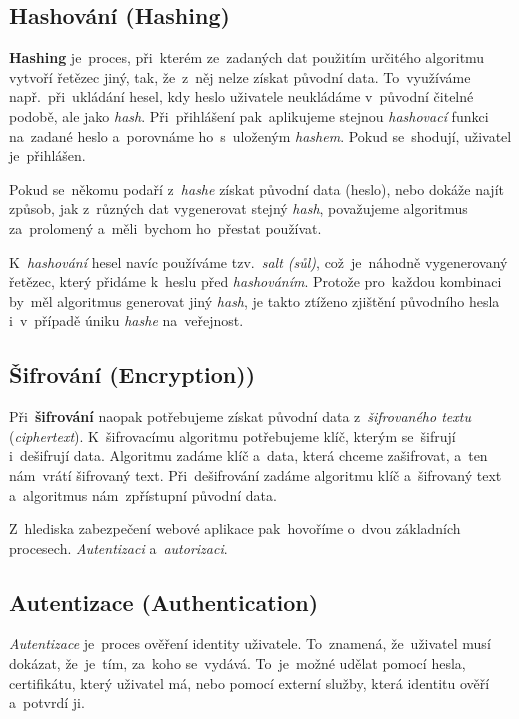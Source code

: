 \documentclass[11pt,a4paper]{report}
\begin{document}
            \subsection{Hashování (Hashing)}
                \textbf{Hashing} je~proces, při~kterém ze~zadaných dat použitím určitého algoritmu vytvoří řetězec jiný, tak, že~z~něj nelze získat původní data. To~využíváme např.~při~ukládání hesel, kdy heslo uživatele neukládáme v~původní čitelné podobě, ale jako \emph{hash}. Při~přihlášení pak~aplikujeme stejnou \emph{hashovací} funkci na~zadané heslo a~porovnáme ho~s~uloženým \emph{hashem}. Pokud se~shodují, uživatel je~přihlášen.
                
                Pokud se~někomu podaří z~\emph{hashe} získat původní data (heslo), nebo dokáže najít způsob, jak z~různých dat vygenerovat stejný \emph{hash}, považujeme algoritmus za~prolomený a~měli~bychom ho~přestat používat.
                
                K~\emph{hashování} hesel navíc používáme tzv.~\emph{salt (sůl)}, což~je~náhodně vygenerovaný řetězec, který přidáme k~heslu před \emph{hashováním}. Protože pro~každou kombinaci by~měl algoritmus generovat jiný \emph{hash}, je takto ztíženo zjištění původního hesla i~v~případě úniku \emph{hashe} na~veřejnost.
        
            \subsection{Šifrování (Encryption))}
                Při~\textbf{šifrování} naopak potřebujeme získat původní data z~\emph{šifrovaného textu} (\emph{ciphertext}). K~šifrovacímu algoritmu potřebujeme klíč, kterým se~šifrují i~dešifrují data. Algoritmu zadáme klíč a~data, která chceme zašifrovat, a~ten nám~vrátí šifrovaný text. Při~dešifrování zadáme algoritmu klíč a~šifrovaný text a~algoritmus nám~zpřístupní původní data.

                Z~hlediska zabezpečení webové aplikace pak~hovoříme o~dvou základních procesech. \emph{Autentizaci} a~\emph{autorizaci}.

            \subsection{Autentizace (Authentication)}
                \emph{Autentizace} je~proces ověření identity uživatele. To~znamená, že~uživatel musí dokázat, že~je~tím, za~koho se~vydává. To~je~možné udělat pomocí hesla, certifikátu, který uživatel má, nebo pomocí externí služby, která identitu ověří a~potvrdí ji.
                
\end{document}
